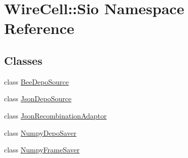\hypertarget{namespace_wire_cell_1_1_sio}{}\section{Wire\+Cell\+:\+:Sio Namespace Reference}
\label{namespace_wire_cell_1_1_sio}
\subsection*{Classes}
\begin{DoxyCompactItemize}
\item 
class \hyperlink{class_wire_cell_1_1_sio_1_1_bee_depo_source}{Bee\+Depo\+Source}
\item 
class \hyperlink{class_wire_cell_1_1_sio_1_1_json_depo_source}{Json\+Depo\+Source}
\item 
class \hyperlink{class_sio_1_1_json_recombination_adaptor}{Json\+Recombination\+Adaptor}
\item 
class \hyperlink{class_wire_cell_1_1_sio_1_1_numpy_depo_saver}{Numpy\+Depo\+Saver}
\item 
class \hyperlink{class_wire_cell_1_1_sio_1_1_numpy_frame_saver}{Numpy\+Frame\+Saver}
\end{DoxyCompactItemize}

